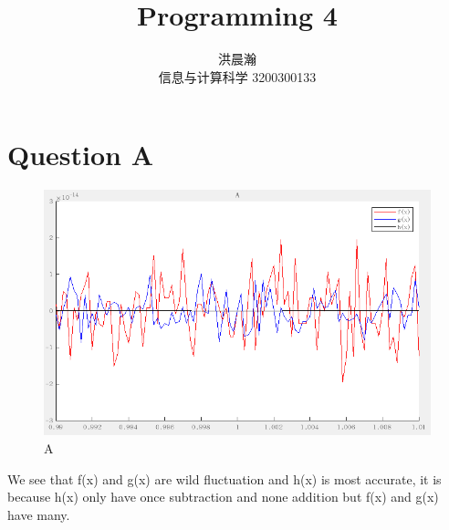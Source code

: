 \documentclass{ctexart}
\title{Programming 4}
\author{洪晨瀚 \\ 信息与计算科学 3200300133}
\begin{document}
\maketitle
\graphicspath{{image/}}



\section*{Question A}
\begin{flushleft}
  \begin{figure}[H]
  \centering
    \centering
    \includegraphics[width=12cm]{A}
    \caption{A}
  \end{figure}
  
  We see that f(x) and g(x) are wild fluctuation and h(x) is most accurate, it is because h(x) only have once subtraction and none addition but f(x) and g(x) have many.
\end{flushleft} 

\clearpage
\end{document}
